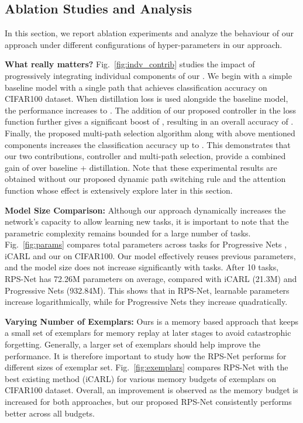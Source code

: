 \subsection{Ablation Studies and Analysis}\label{sec:ablation}
In this section, we report ablation experiments and analyze the behaviour of our approach under different configurations of hyper-parameters in our approach. 

\textbf{What really matters?} Fig.~\ref{fig:indv_contrib} studies the impact of progressively integrating individual components of our \ours{}. We begin with a simple baseline model with a single path that achieves  classification accuracy on CIFAR100 dataset. When distillation loss is used alongside the baseline model, the performance increases to . The addition of our proposed controller   in the loss function further gives a significant boost of , resulting in an overall accuracy of . Finally, the proposed multi-path selection algorithm along with above mentioned components increases the classification accuracy up to . This demonstrates that our two contributions, controller and multi-path selection, provide a combined gain of  over baseline + distillation. Note that these experimental results are obtained without our proposed dynamic path switching rule and the attention function whose effect is extensively explore later in this section.


\textbf{Model Size Comparison:} Although our approach dynamically increases the network's capacity to allow learning new tasks, it is important to note that the parametric complexity remains bounded for a large number of tasks. Fig.~\ref{fig:params} compares total parameters across tasks for Progressive Nets \cite{rusu2016progressive}, iCARL \cite{rebuffi2017icarl} and our \ours{} on CIFAR100. Our model effectively reuses previous parameters, and the model size does not increase significantly with tasks. After 10 tasks, {RPS-Net} has 72.26M parameters on average, compared with iCARL  (21.3M) and Progressive Nets (932.84M). This shows that in RPS-Net, learnable parameters increase logarithmically, while for Progressive Nets they increase quadratically.

\textbf{Varying Number of Exemplars:} Ours is a memory based approach that keeps a small set of exemplars for memory replay at later stages to avoid catastrophic forgetting. Generally, a larger set of exemplars should help improve the performance. It is therefore important to study how the RPS-Net performs for different sizes of exemplar set. Fig.~\ref{fig:exemplars} compares RPS-Net with the best existing method (iCARL) for various memory budgets of exemplars on CIFAR100 dataset. Overall, an improvement is observed as the memory budget is increased for both approaches, but our proposed RPS-Net consistently performs better across all budgets. 

